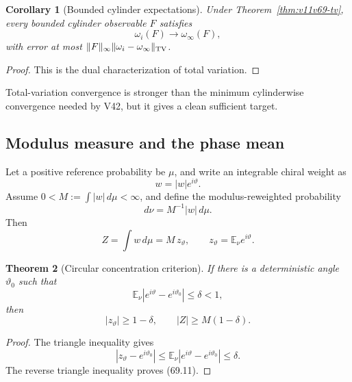 \documentclass[11pt]{article}
\newtheorem{theorem}{Theorem}[section]
\newtheorem{corollary}[theorem]{Corollary}
\begin{document}
\begin{corollary}[Bounded cylinder expectations]
\label{cor:v11v69-cylinder}
Under Theorem~\ref{thm:v11v69-tv}, every bounded cylinder observable
\(F\) satisfies
\[
                         \omega_i(F)\longrightarrow
                         \omega_\infty(F),                    \tag{69.6}
\]
with error at most
\(\lVert F\rVert_\infty
 \lVert\omega_i-\omega_\infty\rVert_{\rm TV}\).
\end{corollary}

\begin{proof}
This is the dual characterization of total variation.
\end{proof}

Total-variation convergence is stronger than the minimum cylinderwise
convergence needed by V42, but it gives a clean sufficient target.

\subsection{Modulus measure and the phase mean}

Let a positive reference probability be \(\mu\), and write an
integrable chiral weight as
\[
                         w=|w|e^{i\vartheta}.                 \tag{69.7}
\]
Assume \(0<M:=\int|w|\,d\mu<\infty\), and define the modulus-reweighted
probability
\[
                              d\nu=M^{-1}|w|\,d\mu.            \tag{69.8}
\]
Then
\[
                         Z=\int w\,d\mu
                           =M\,z_\vartheta,\qquad
                         z_\vartheta={\mathbb E}_\nu
                                      e^{i\vartheta}.         \tag{69.9}
\]

\begin{theorem}[Circular concentration criterion]
\label{thm:v11v69-circular}
If there is a deterministic angle \(\vartheta_0\) such that
\[
                  {\mathbb E}_\nu
                  |e^{i\vartheta}-e^{i\vartheta_0}|
                              \le\delta<1,                    \tag{69.10}
\]
then
\[
                              |z_\vartheta|\ge1-\delta,\qquad
                              |Z|\ge M(1-\delta).              \tag{69.11}
\]
\end{theorem}

\begin{proof}
The triangle inequality gives
\[
 |z_\vartheta-e^{i\vartheta_0}|
 \le{\mathbb E}_\nu
     |e^{i\vartheta}-e^{i\vartheta_0}|
 \le\delta.
\]
The reverse triangle inequality proves (69.11).
\end{proof}
\end{document}
